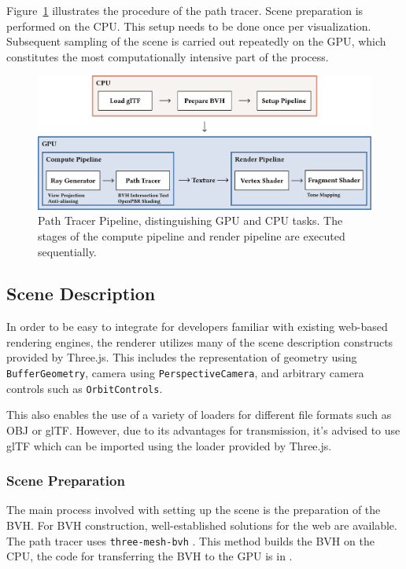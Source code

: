 Figure~\ref{fig:path-tracer} illustrates the procedure of the path tracer. Scene preparation is performed on the \gls{CPU}. This setup needs to be done once per visualization. Subsequent sampling of the scene is carried out repeatedly on the \gls{GPU}, which constitutes the most computationally intensive part of the process.

\begin{figure}[H]
    \includegraphics[width=1.0\columnwidth]{resources/path-tracer-pipeline.png}
    \caption{Path Tracer Pipeline, distinguishing \gls{GPU} and \gls{CPU} tasks. The stages of the compute pipeline and render pipeline are executed sequentially.}
    \label{fig:path-tracer}
\end{figure}

\subsection*{Scene Description}

In order to be easy to integrate for developers familiar with existing web-based rendering engines, the renderer utilizes many of the scene description constructs provided by \gls{Three.js}. This includes the representation of geometry using \texttt{BufferGeometry}, camera using \texttt{PerspectiveCamera}, and arbitrary camera controls such as \texttt{OrbitControls}.

This also enables the use of a variety of loaders for different file formats such as \gls{OBJ} or \gls{glTF}. However, due to its advantages for transmission, it's advised to use \gls{glTF} which can be imported using the loader provided by \gls{Three.js}.

\subsubsection{Scene Preparation}

The main process involved with setting up the scene is the preparation of the \gls{BVH}. For \gls{BVH} construction, well-established solutions for the web are available. The path tracer uses \texttt{three-mesh-bvh} \cite{threeMeshBvh}. This method builds the \gls{BVH} on the \gls{CPU}, the code for transferring the \gls{BVH} to the \gls{GPU} is in .

